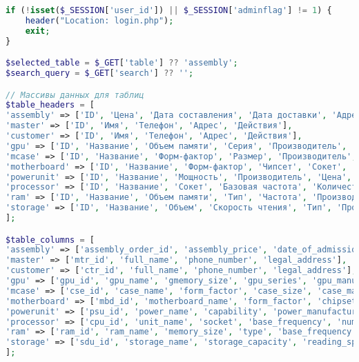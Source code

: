 \begin{lstlisting}[language=Php, frame=none]
if (!isset($_SESSION['user_id']) || $_SESSION['adminflag'] != 1) {
	header("Location: login.php");
	exit;
}

$selected_table = $_GET['table'] ?? 'assembly';
$search_query = $_GET['search'] ?? '';

// Массивы данных для таблиц
$table_headers = [
'assembly' => ['ID', 'Цена', 'Дата составления', 'Дата доставки', 'Адрес доставки', 'ID клиента', 'ID мастера', 'GPU ID', 'Case ID', 'Motherboard ID', 'Power Unit ID', 'Processor ID', 'RAM ID', 'Storage ID', 'Действия'],
'master' => ['ID', 'Имя', 'Телефон', 'Адрес', 'Действия'],
'customer' => ['ID', 'Имя', 'Телефон', 'Адрес', 'Действия'],
'gpu' => ['ID', 'Название', 'Объем памяти', 'Серия', 'Производитель', 'Цена', 'Действия'],
'mcase' => ['ID', 'Название', 'Форм-фактор', 'Размер', 'Производитель', 'Цена', 'Действия'],
'motherboard' => ['ID', 'Название', 'Форм-фактор', 'Чипсет', 'Сокет', 'Производитель', 'Цена', 'Действия'],
'powerunit' => ['ID', 'Название', 'Мощность', 'Производитель', 'Цена', 'Действия'],
'processor' => ['ID', 'Название', 'Сокет', 'Базовая частота', 'Количество ядер', 'Производитель', 'Цена', 'Действия'],
'ram' => ['ID', 'Название', 'Объем памяти', 'Тип', 'Частота', 'Производитель', 'Цена', 'Действия'],
'storage' => ['ID', 'Название', 'Объем', 'Скорость чтения', 'Тип', 'Производитель', 'Цена', 'Действия']
];

$table_columns = [
'assembly' => ['assembly_order_id', 'assembly_price', 'date_of_admission', 'date_of_delivery', 'delivery_address', 'ctr_id', 'mtr_id', 'gpu_id', 'cse_id', 'mbd_id', 'psu_id', 'cpu_id', 'ram_id', 'sdu_id'],
'master' => ['mtr_id', 'full_name', 'phone_number', 'legal_address'],
'customer' => ['ctr_id', 'full_name', 'phone_number', 'legal_address'],
'gpu' => ['gpu_id', 'gpu_name', 'gmemory_size', 'gpu_series', 'gpu_manufacturer', 'price'],
'mcase' => ['cse_id', 'case_name', 'form_factor', 'case_size', 'case_manufacturer', 'price'],
'motherboard' => ['mbd_id', 'motherboard_name', 'form_factor', 'chipset', 'socket', 'board_manufacturer', 'price'],
'powerunit' => ['psu_id', 'power_name', 'capability', 'power_manufacturer', 'price'],
'processor' => ['cpu_id', 'unit_name', 'socket', 'base_frequency', 'number_of_cores', 'cpu_manufacturer', 'price'],
'ram' => ['ram_id', 'ram_name', 'memory_size', 'type', 'base_frequency', 'ram_manufacturer', 'price'],
'storage' => ['sdu_id', 'storage_name', 'storage_capacity', 'reading_speed', 'sdu_type', 'sdu_manufacturer', 'price']
];


\end{lstlisting}
